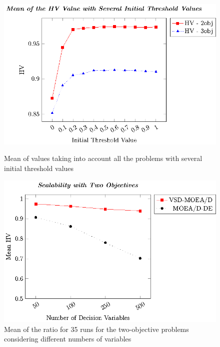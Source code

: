 


\begin{figure}[t]
\centering
\includegraphics[scale=0.85]{images/Graphic-Initial-Distance_tikz-figure0.eps} \\
\caption{Mean of \HV{} values taking into account all the problems with several initial threshold values}\label{fig:Initial-distance-factor}
\end{figure}



\begin{figure}[t]
\centering
\includegraphics[scale=0.85]{images/Graphic-Scalability-2obj_tikz-figure0.eps}
\caption{Mean of the \HV{} ratio for 35 runs for the two-objective problems considering different numbers of variables}\label{fig:variable-decision-scalability-2obj}
\end{figure}

